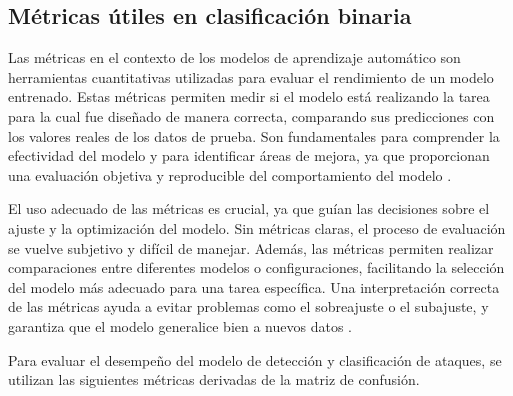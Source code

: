 \subsection{Métricas útiles en clasificación binaria}  \label{sec.metricas-bin}
Las métricas en el contexto de los modelos de aprendizaje automático son herramientas cuantitativas utilizadas para evaluar el rendimiento de un modelo entrenado. Estas métricas permiten medir si el modelo está realizando la tarea para la cual fue diseñado de manera correcta, comparando sus predicciones con los valores reales de los datos de prueba. Son fundamentales para comprender la efectividad del modelo y para identificar áreas de mejora, ya que proporcionan una evaluación objetiva y reproducible del comportamiento del modelo \cite{hastie2009elements}.

El uso adecuado de las métricas es crucial, ya que guían las decisiones sobre el ajuste y la optimización del modelo. Sin métricas claras, el proceso de evaluación se vuelve subjetivo y difícil de manejar. Además, las métricas permiten realizar comparaciones entre diferentes modelos o configuraciones, facilitando la selección del modelo más adecuado para una tarea específica. Una interpretación correcta de las métricas ayuda a evitar problemas como el sobreajuste o el subajuste, y garantiza que el modelo generalice bien a nuevos datos \cite{goodfellow2016deep}.

Para evaluar el desempeño del modelo de detección y clasificación de ataques, se utilizan las siguientes métricas derivadas de la matriz de confusión.


